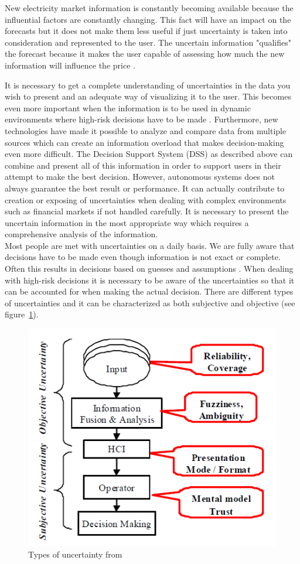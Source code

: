 New electricity market information is constantly becoming available because the influential factors are constantly changing. This fact will have an impact on the forecasts but it does not make them less useful if just uncertainty is taken into consideration and represented to the user. The uncertain information "qualifies" the forecast because it makes the user capable of assessing how much the new information will influence the price \cite{EnergyPriceForecasting}.
  
It is necessary to get a complete understanding of uncertainties in the data you wish to present and an adequate way of visualizing it to the user. This becomes even more important when the information is to be used in dynamic environments where high-risk decisions have to be made \cite{UncertainInformation}. Furthermore, new technologies have made it possible to analyze and compare data from multiple sources which can create an information overload that makes decision-making even more difficult. The Decision Support System (DSS) as described above can combine and present all of this information in order to support users in their attempt to make the best decision. However, autonomous systems does not always guarantee the best result or performance. It can actually contribute to creation or exposing of uncertainties when dealing with complex environments such as financial markets \cite{UncertainInformation} if not handled carefully. It is necessary to present the uncertain information in the most appropriate way which requires a comprehensive analysis of the information.
\\[0.5cm]
Most people are met with uncertainties on a daily basis. We are fully aware that decisions have to be made even though information is not exact or complete. Often this results in decisions based on guesses and assumptions \cite{UncertainInformation}. When dealing with high-risk decisions it is necessary to be aware of the uncertainties so that it can be accounted for when making the actual decision. 
There are different types of uncertainties and it can be characterized as both subjective and objective (see figure~\ref{fig:typesOfUncertainty}). 
\begin{figure}[h!]
\centering
\includegraphics[width=0.7\linewidth,natwidth=898,natheight=587]{billeder/TypesOfUncertainInformation.png}
\caption{Types of uncertainty from \cite{UncertainInformation}}
\label{fig:typesOfUncertainty}
\end{figure}  

